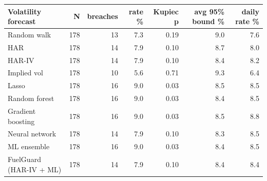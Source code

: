 \begin{tabular}{lrrrrrr}
\toprule
Volatility forecast & N & breaches & rate \% & Kupiec p & avg 95\% bound \% & daily rate \% \\
\midrule
Random walk & 178 & 13 & 7.3 & 0.19 & 9.0 & 7.6 \\
HAR & 178 & 14 & 7.9 & 0.10 & 8.7 & 8.0 \\
HAR-IV & 178 & 14 & 7.9 & 0.10 & 8.4 & 8.2 \\
Implied vol & 178 & 10 & 5.6 & 0.71 & 9.3 & 6.4 \\
Lasso & 178 & 16 & 9.0 & 0.03 & 8.5 & 8.5 \\
Random forest & 178 & 16 & 9.0 & 0.03 & 8.4 & 8.5 \\
Gradient boosting & 178 & 16 & 9.0 & 0.03 & 8.5 & 8.8 \\
Neural network & 178 & 14 & 7.9 & 0.10 & 8.3 & 8.5 \\
ML ensemble & 178 & 16 & 9.0 & 0.03 & 8.4 & 8.5 \\
FuelGuard (HAR-IV + ML) & 178 & 14 & 7.9 & 0.10 & 8.4 & 8.4 \\
\bottomrule
\end{tabular}

